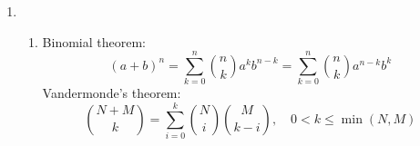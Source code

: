 \documentclass[12pt]{article}
\begin{document}
\begin{enumerate}
\item
\begin{enumerate}

\item
Binomial theorem:
\begin{equation*}
(a + b)^n = \sum_{k=0}^n \binom{n}{k} a^k b^{n-k} = \sum_{k=0}^n \binom{n}{k} a^{n-k} b^k
\end{equation*}
Vandermonde's theorem:
\begin{equation*}
\binom{N + M}{k} = \sum_{i=0}^k \binom{N}{i} \binom{M}{k-i}, \quad 0 < k \leq \min(N, M) 
\end{equation*}


\end{enumerate}
\end{enumerate}
\end{document}
